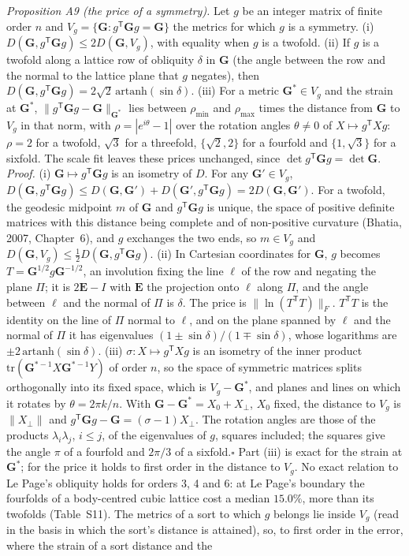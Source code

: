 \documentclass[preprint,pdf]{iucr}          %
\newcommand{\Gmet}{\mathbf{G}}
\newcommand{\dist}{D}
\begin{document}
\emph{Proposition A9 (the price of a symmetry).} Let $g$ be an integer matrix of finite order $n$ and $V_g=\{\Gmet:g^{\mathsf T}\Gmet g=\Gmet\}$ the metrics for which $g$ is a symmetry. (i) $\dist(\Gmet,g^{\mathsf T}\Gmet g)\le2\dist(\Gmet,V_g)$, with equality when $g$ is a twofold. (ii) If $g$ is a twofold along a lattice row of obliquity $\delta$ in $\Gmet$ (the angle between the row and the normal to the lattice plane that $g$ negates), then $\dist(\Gmet,g^{\mathsf T}\Gmet g)=2\sqrt2\,\mathrm{artanh}(\sin\delta)$. (iii) For a metric $\Gmet^*\in V_g$ and the strain at $\Gmet^*$, $\|g^{\mathsf T}\Gmet g-\Gmet\|_{\Gmet^*}$ lies between $\rho_{\min}$ and $\rho_{\max}$ times the distance from $\Gmet$ to $V_g$ in that norm, with $\rho=|e^{i\theta}-1|$ over the rotation angles $\theta\ne0$ of $X\mapsto g^{\mathsf T}Xg$: $\rho=2$ for a twofold, $\sqrt3$ for a threefold, $\{\sqrt2,2\}$ for a fourfold and $\{1,\sqrt3\}$ for a sixfold. The scale fit leaves these prices unchanged, since $\det g^{\mathsf T}\Gmet g=\det\Gmet$. \emph{Proof.} (i) $\Gmet\mapsto g^{\mathsf T}\Gmet g$ is an isometry of $\dist$. For any $\Gmet'\in V_g$, $\dist(\Gmet,g^{\mathsf T}\Gmet g)\le\dist(\Gmet,\Gmet')+\dist(\Gmet',g^{\mathsf T}\Gmet g)=2\dist(\Gmet,\Gmet')$. For a twofold, the geodesic midpoint $m$ of $\Gmet$ and $g^{\mathsf T}\Gmet g$ is unique, the space of positive definite matrices with this distance being complete and of non-positive curvature (Bhatia, 2007, Chapter~6), and $g$ exchanges the two ends, so $m\in V_g$ and $\dist(\Gmet,V_g)\le\frac12\dist(\Gmet,g^{\mathsf T}\Gmet g)$. (ii) In Cartesian coordinates for $\Gmet$, $g$ becomes $T=\Gmet^{1/2}g\Gmet^{-1/2}$, an involution fixing the line $\ell$ of the row and negating the plane $\Pi$; it is $2\mathbf E-I$ with $\mathbf E$ the projection onto $\ell$ along $\Pi$, and the angle between $\ell$ and the normal of $\Pi$ is $\delta$. The price is $\|\ln(T^{\mathsf T}T)\|_F$. $T^{\mathsf T}T$ is the identity on the line of $\Pi$ normal to $\ell$, and on the plane spanned by $\ell$ and the normal of $\Pi$ it has eigenvalues $(1\pm\sin\delta)/(1\mp\sin\delta)$, whose logarithms are $\pm2\,\mathrm{artanh}(\sin\delta)$. (iii) $\sigma:X\mapsto g^{\mathsf T}Xg$ is an isometry of the inner product $\mathrm{tr}(\Gmet^{*-1}X\Gmet^{*-1}Y)$ of order $n$, so the space of symmetric matrices splits orthogonally into its fixed space, which is $V_g-\Gmet^*$, and planes and lines on which it rotates by $\theta=2\pi k/n$. With $\Gmet-\Gmet^*=X_0+X_\perp$, $X_0$ fixed, the distance to $V_g$ is $\|X_\perp\|$ and $g^{\mathsf T}\Gmet g-\Gmet=(\sigma-1)X_\perp$. The rotation angles are those of the products $\lambda_i\lambda_j$, $i\le j$, of the eigenvalues of $g$, squares included; the squares give the angle $\pi$ of a fourfold and $2\pi/3$ of a sixfold.\hfill$\square$ Part (iii) is exact for the strain at $\Gmet^*$; for the price it holds to first order in the distance to $V_g$. No exact relation to Le Page's obliquity holds for orders 3, 4 and 6: at Le Page's boundary the fourfolds of a body-centred cubic lattice cost a median $15.0\%$, more than its twofolds (Table~S11). The metrics of a sort to which $g$ belongs lie inside $V_g$ (read in the basis in which the sort's distance is attained), so, to first order in the error, where the strain of a sort distance and the 
\end{document}
